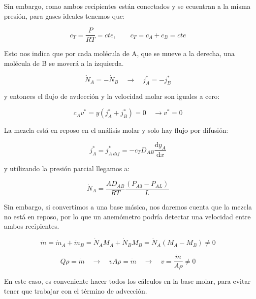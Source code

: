 \documentclass[11pt]{article}
\begin{document}
Sin embargo, como ambos recipientes están conectados y se ecuentran a la misma presión, para gases ideales tenemos que:

\[ c_T = \frac{P}{RT} = cte, \qquad c_T = c_A + c_B = cte \]

Esto nos indica que por cada molécula de A, que se mueve a la derecha, una molécula de B se moverá a la izquierda.

\[ {\dot N}_A = -{\dot N}_B \quad \longrightarrow \quad j_A^* = -j_B^* \]

y entonces el flujo de avdección y la velocidad molar son iguales a cero:

\[ c_A v^* = y \left( j_A^* + j_B^* \right) = 0 \quad \longrightarrow v^* = 0 \]

La mezcla está en reposo en el análisis molar y solo hay flujo por difusión:

\[ j_A^* = j_{A \ dif}^* = -c_T D_{AB} \frac{ \mathrm d y_A }{ \mathrm d x } \]

y utilizando la presión parcial llegamos a:

\[ \boxed{ {\dot N}_A = \frac{A D_{AB}}{RT} \frac{ \left( P_{A0} - P_{AL} \right) }{ L } } \]

Sin embargo, si convertimos a una base másica, nos daremos cuenta que la mezcla no está en reposo, por lo que un anemómetro podría detectar una velocidad entre ambos recipientes.

\[ \dot m = {\dot m}_A + {\dot m }_B = {\dot N}_A M_A + {\dot N}_B M_B = {\dot N}_A \left( M_A - M_B \right) \neq 0 \]

\[ Q \rho = \dot m \quad \longrightarrow \quad vA \rho = \dot m \quad \longrightarrow \quad v = \frac{ \dot m }{ A \rho } \neq 0 \]

En este caso, es conveniente hacer todos los cálculos en la base molar, para evitar tener que trabajar con el término de advección.

\end{document}
